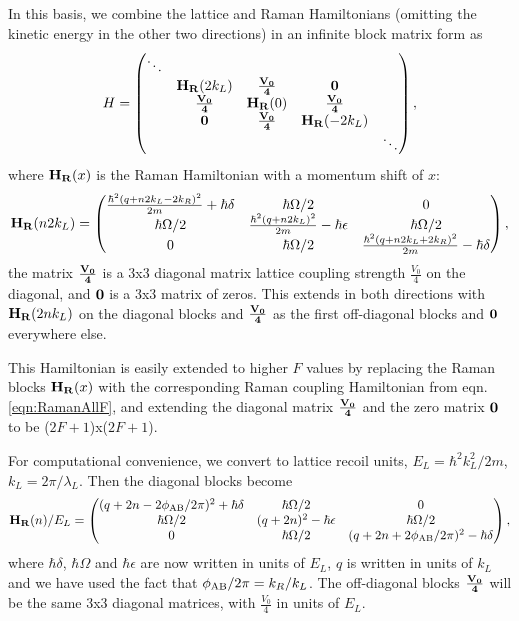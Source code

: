 In this basis, we combine the lattice and Raman Hamiltonians (omitting the kinetic energy in the other two directions) in an infinite block matrix form as 
\begin{equation}
H =
 \begin{pmatrix} \ddots &  & & & \\ 
 &{\bf H_R}(2k_L)  & {\bf \frac{V_0}{4}} &{\bf 0} &  \\
 &  {\bf \frac{V_0}{4}} &{\bf H_R}(0) & {\bf \frac{V_0}{4}}&  \\
 & {\bf 0} &  {\bf \frac{V_0}{4}} & {\bf H_R}(-2k_L)  &  \\
 & & & &  \ddots \end{pmatrix} \\,
\label{eqn:SynDimHam}
\end{equation}
where ${\bf H_R}(x)$ is the Raman Hamiltonian with a momentum shift of $x$:
 \begin{equation}
{\bf H_R}(n 2k_L) = 
 \begin{pmatrix} \frac{\hbar^2(q + n 2k_L -2k_R)^2}{2m}+\hbar\delta & \hbar\Omega/2  &  0  \\ 
\hbar\Omega/2 & \frac{\hbar^2 (q+n 2k_L)^2}{2m} - \hbar\epsilon &  \hbar\Omega/2\\
 0 & \hbar\Omega/2 &  \frac{\hbar^2(q+n 2k_L+2k_R)^2}{2m} -\hbar\delta  \\
 \end{pmatrix} \\,
\end{equation}
the matrix ${\bf \frac{V_0}{4}}$ is a 3x3 diagonal matrix lattice coupling strength $\frac{V_0}{4}$ on the diagonal, and $\bf 0$ is a 3x3 matrix of zeros. This extends in both directions with ${\bf H_R}(2nk_L)$ on the diagonal blocks and ${\bf \frac{V_0}{4}}$ as the first off-diagonal blocks and $\bf 0$ everywhere else. 

This Hamiltonian is easily extended to higher $F$ values by replacing the Raman blocks ${\bf H_R}(x)$ with the corresponding Raman coupling Hamiltonian from eqn. \ref{eqn:RamanAllF}, and extending the diagonal matrix  ${\bf \frac{V_0}{4}}$ and the zero matrix $\bf 0$ to be ($2F+1$)x($2F+1$).

For computational convenience, we convert to lattice recoil units, $E_L=\hbar^2 k_L^2/2m$, $k_L=2\pi/\lambda_L$. Then the diagonal blocks become
 \begin{equation}
{\bf H_R}(n)/E_L = 
 \begin{pmatrix} (q +2 n -2\phi_{\rm AB}/2\pi)^2+\hbar\delta & \hbar\Omega/2  &  0  \\ 
\hbar\Omega/2 & (q+2 n)^2 - \hbar\epsilon &  \hbar\Omega/2\\
 0 & \hbar\Omega/2 & (q + 2 n + 2 \phi_{\rm AB}/2\pi)^2 -\hbar\delta  \\
 \end{pmatrix} \\,
\end{equation}
where $\hbar\delta$, $\hbar\Omega$ and $\hbar\epsilon$ are now written in units of $E_L$, $q$ is written in units of $k_L$ and we have used the fact that $\phi_{\rm AB}/2\pi = k_R/k_L$. The off-diagonal blocks ${\bf \frac{V_0}{4}}$ will be the same 3x3 diagonal matrices, with $\frac{V_0}{4}$ in units of $E_L$. 


